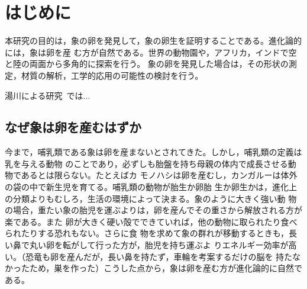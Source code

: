 \chapter{はじめに}
本研究の目的は，象の卵を発見して，象の卵生を証明することである。進化論的には，象は卵を産
む方が自然である。世界の動物園や，アフリカ，インドで空と陸の両面から多角的に探索を行う。
象の卵を発見した場合は，その形状の測定，材質の解析，工学的応用の可能性の検討を行う。

湯川による研究~\cite{yukawa1950quantum}では...

\section{なぜ象は卵を産むはずか}
今まで，哺乳類である象は卵を産まないとされてきた。しかし，哺乳類の定義は乳を与える動物
のことであり，必ずしも胎盤を持ち母親の体内で成長させる動物であるとは限らない。たとえばカ
モノハシは卵を産むし，カンガルーは体外の袋の中で新生児を育てる。哺乳類の動物が胎生か卵胎
生か卵生かは，進化上の分類よりもむしろ，生活の環境によって決まる。象のように大きく強い動
物の場合，重たい象の胎児を運ぶよりは，卵を産んでその重さから解放される方が楽である。また
卵が大きく硬い殻でできていれば，他の動物に取られたり食べられたりする恐れもない。さらに食
物を求めて象の群れが移動するときも，長い鼻で丸い卵を転がして行った方が，胎児を持ち運ぶよ
りエネルギー効率が高い。（恐竜も卵を産んだが，長い鼻を持たず，車輪を考案するだけの脳を
持たなかったため，巣を作った）こうした点から，象は卵を産む方が進化論的に自然である。
